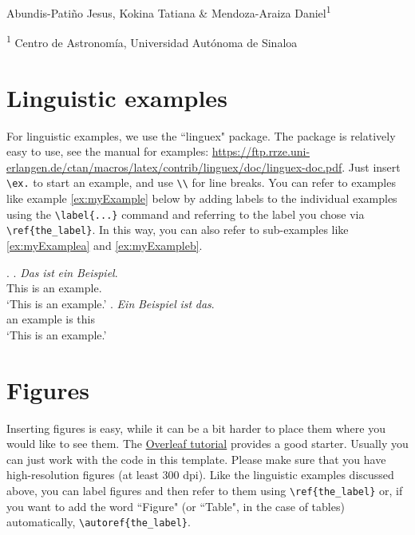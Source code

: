 \vspace{30pt}
\begin{center}
    \LARGE{}
\end{center}

\begin{center}
\vspace{4pt}
\large
    Abundis-Patiño Jesus, Kokina Tatiana \& Mendoza-Araiza Daniel\textsuperscript{1}
    
\small
   \textsuperscript{1} Centro de Astronomía, Universidad Autónoma de Sinaloa

\end{center}





\vspace{10pt}



\section{Linguistic examples} \label{sec:linguex}

For linguistic examples, we use the ``linguex" package. The package is relatively easy to use, see the manual for examples: \url{https://ftp.rrze.uni-erlangen.de/ctan/macros/latex/contrib/linguex/doc/linguex-doc.pdf}. Just insert \verb!\ex.! to start an example, and use \verb!\\! for line breaks. You can refer to examples like example \ref{ex:myExample} below by adding labels to the individual examples using the \verb!\label{...}! command and referring to the label you chose via \verb!\ref{the_label}!. In this way, you can also refer to sub-examples like \ref{ex:myExamplea} and \ref{ex:myExampleb}.
 
\ex. \label{ex:myExample}
 \ag. \textit{Das} \textit{ist} \textit{ein} \textit{Beispiel}. \\
  This is an example. \\
  `This is an example.' \label{ex:myExamplea}
  \bg. \textit{Ein} \textit{Beispiel} \textit{ist} \textit{das}. \\
  an example is this \\
  `This is an example.' \label{ex:myExampleb}


\section{Figures}

Inserting figures is easy, while it can be a bit harder to place them where you would like to see them. The \href{https://www.overleaf.com/learn/latex/Inserting_Images}{Overleaf tutorial} provides a good starter. Usually you can just work with the code in this template. Please make sure that you have high-resolution figures (at least 300 dpi). Like the linguistic examples discussed above, you can label figures and then refer to them using \verb!\ref{the_label}! or, if you want to add the word ``Figure" (or ``Table", in the case of tables) automatically, \verb!\autoref{the_label}!.


